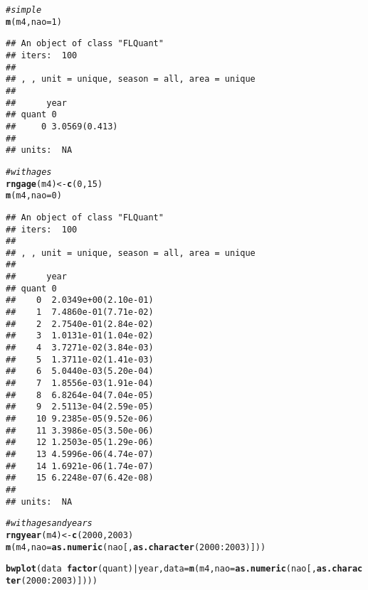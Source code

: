 \documentclass[a4paper,english,10pt]{article}\usepackage[]{graphicx}\usepackage[]{color}
\makeatletter
\newcommand{\hlnum}[1]{\textcolor[rgb]{0.686,0.059,0.569}{#1}}%
\newcommand{\hlcom}[1]{\textcolor[rgb]{0.678,0.584,0.686}{\textit{#1}}}%
\newcommand{\hlopt}[1]{\textcolor[rgb]{0,0,0}{#1}}%
\newcommand{\hlstd}[1]{\textcolor[rgb]{0.345,0.345,0.345}{#1}}%
\newcommand{\hlkwb}[1]{\textcolor[rgb]{0.69,0.353,0.396}{#1}}%
\newcommand{\hlkwc}[1]{\textcolor[rgb]{0.333,0.667,0.333}{#1}}%
\newcommand{\hlkwd}[1]{\textcolor[rgb]{0.737,0.353,0.396}{\textbf{#1}}}%
\newenvironment{kframe}{%
 \def\at@end@of@kframe{}%
 \ifinner\ifhmode%
  \def\at@end@of@kframe{\end{minipage}}%
  \begin{minipage}{\columnwidth}%
 \fi\fi%
 \def\FrameCommand##1{\hskip\@totalleftmargin \hskip-\fboxsep
 \colorbox{shadecolor}{##1}\hskip-\fboxsep
     \hskip-\linewidth \hskip-\@totalleftmargin \hskip\columnwidth}%
 \MakeFramed {\advance\hsize-\width
   \@totalleftmargin\z@ \linewidth\hsize
   \@setminipage}}%
 {\par\unskip\endMakeFramed%
 \at@end@of@kframe}
\newenvironment{knitrout}{}{} %
\makeatother
\begin{document}
\begin{knitrout}
\color{fgcolor}\begin{kframe}
\begin{alltt}
\hlcom{# simple}
\hlkwd{m}\hlstd{(m4,} \hlkwc{nao} \hlstd{=} \hlnum{1}\hlstd{)}
\end{alltt}
\begin{verbatim}
## An object of class "FLQuant"
## iters:  100 
## 
## , , unit = unique, season = all, area = unique
## 
##      year
## quant 0            
##     0 3.0569(0.413)
## 
## units:  NA
\end{verbatim}
\begin{alltt}
\hlcom{# with ages}
\hlkwd{rngage}\hlstd{(m4)} \hlkwb{<-} \hlkwd{c}\hlstd{(}\hlnum{0}\hlstd{,} \hlnum{15}\hlstd{)}
\hlkwd{m}\hlstd{(m4,} \hlkwc{nao} \hlstd{=} \hlnum{0}\hlstd{)}
\end{alltt}
\begin{verbatim}
## An object of class "FLQuant"
## iters:  100 
## 
## , , unit = unique, season = all, area = unique
## 
##      year
## quant 0                   
##    0  2.0349e+00(2.10e-01)
##    1  7.4860e-01(7.71e-02)
##    2  2.7540e-01(2.84e-02)
##    3  1.0131e-01(1.04e-02)
##    4  3.7271e-02(3.84e-03)
##    5  1.3711e-02(1.41e-03)
##    6  5.0440e-03(5.20e-04)
##    7  1.8556e-03(1.91e-04)
##    8  6.8264e-04(7.04e-05)
##    9  2.5113e-04(2.59e-05)
##    10 9.2385e-05(9.52e-06)
##    11 3.3986e-05(3.50e-06)
##    12 1.2503e-05(1.29e-06)
##    13 4.5996e-06(4.74e-07)
##    14 1.6921e-06(1.74e-07)
##    15 6.2248e-07(6.42e-08)
## 
## units:  NA
\end{verbatim}
\begin{alltt}
\hlcom{# with ages and years}
\hlkwd{rngyear}\hlstd{(m4)} \hlkwb{<-} \hlkwd{c}\hlstd{(}\hlnum{2000}\hlstd{,} \hlnum{2003}\hlstd{)}
\hlkwd{m}\hlstd{(m4,} \hlkwc{nao} \hlstd{=} \hlkwd{as.numeric}\hlstd{(nao[,} \hlkwd{as.character}\hlstd{(}\hlnum{2000}\hlopt{:}\hlnum{2003}\hlstd{)]))}
\end{alltt}


{\ttfamily\noindent\bfseries\color{errorcolor}{\#\# Error: object 'nao' not found}}\end{kframe}
\end{knitrout}


\begin{knitrout}
\color{fgcolor}\begin{kframe}
\begin{alltt}
\hlkwd{bwplot}\hlstd{(data} \hlopt{~} \hlkwd{factor}\hlstd{(quant)} \hlopt{|} \hlstd{year,} \hlkwc{data} \hlstd{=} \hlkwd{m}\hlstd{(m4,} \hlkwc{nao} \hlstd{=} \hlkwd{as.numeric}\hlstd{(nao[,} \hlkwd{as.character}\hlstd{(}\hlnum{2000}\hlopt{:}\hlnum{2003}\hlstd{)])))}
\end{alltt}


{\ttfamily\noindent\bfseries\color{errorcolor}{\#\# Error: error in evaluating the argument 'data' in selecting a method for function 'bwplot': Error in .local(object, ...) : object 'nao' not found\\\#\# Calls: m -> m -> .local}}\end{kframe}
\end{knitrout}
\end{document}
